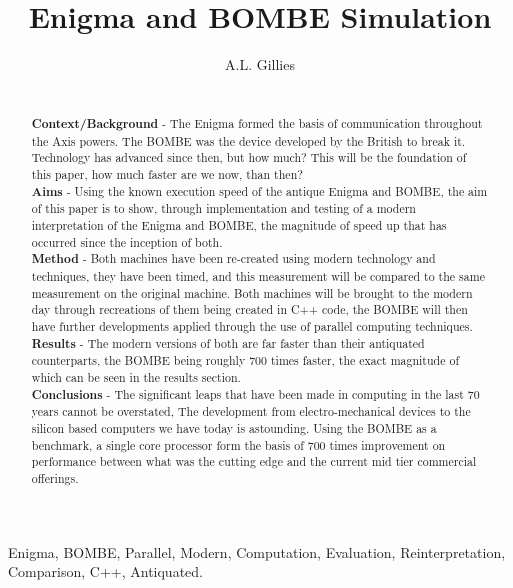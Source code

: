 \documentclass[12pt,a4paper]{article}
\title{Enigma and BOMBE Simulation}
\author{A.L. Gillies}
\date{}
\begin{document}
\maketitle

\begin{abstract}\\

{\bf Context/Background} - The Enigma formed the basis of communication throughout the Axis powers. The BOMBE was the device developed by the British to break it.  Technology has advanced since then, but how much? This will be the foundation of this paper, how much faster are we now, than then?\\

{\bf Aims} - Using the known execution speed of the antique Enigma and BOMBE, the aim of this paper is to show, through implementation and testing of a modern interpretation of the Enigma and BOMBE, the magnitude of speed up that has occurred since the inception of both.\\

{\bf Method} - Both machines have been re-created using modern technology and techniques, they have been timed, and this measurement will be compared to the same measurement on the original machine. Both machines will be brought to the modern day through recreations of them being created in C++ code, the BOMBE will then have further developments applied through the use of parallel computing techniques.\\

{\bf Results} - The modern versions of both are far faster than their antiquated counterparts, the BOMBE being roughly 700 times faster, the exact magnitude of which can be seen in the results section.\\

{\bf Conclusions} - The significant leaps that have been made in computing in the last 70 years cannot be overstated, The development from electro-mechanical devices to the silicon based computers we have today is astounding. Using the BOMBE as a benchmark, a single core processor form the basis of 700 times improvement on performance between what was the cutting edge and the current mid tier commercial offerings.
\end{abstract}

\begin{keywords}
Enigma, BOMBE, Parallel, Modern, Computation, Evaluation, Reinterpretation, Comparison, C++, Antiquated.
\end{keywords}
\end{document}
